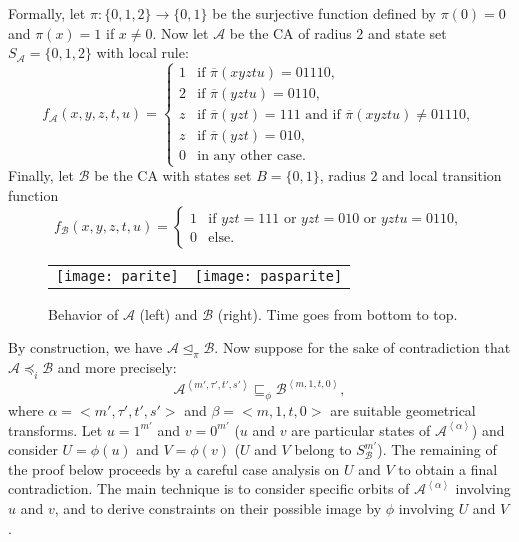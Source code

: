 \documentclass[a4paper]{elsarticle}
\newcommand{\ACA}{\mathcal{A}}
\newcommand{\ACB}{\mathcal{B}}
\newcommand{\locA}{f_{\ACA}}
\newcommand{\locB}{f_{\ACB}}
\newcommand\alphabe[1]{S_{#1}}
\newcommand{\alphA}{\alphabe{\ACA}}
\newcommand{\alphB}{\alphabe{\ACB}}
\newcommand\sac{\sqsubseteq}
\newcommand{\fac}{\trianglelefteq}
\newcommand\bulk[2]{{#1}^{\left\langle{#2}\right\rangle}}
\newcommand{\simu}{\preccurlyeq}
\newcommand{\sacsimu}{\simu_i}
\begin{document}
\begin{pf}
  Formally, let ${\pi : \{0,1,2\}\rightarrow \{0,1\}}$ be the
  surjective function defined by ${\pi(0)=0}$ and ${\pi(x)=1}$ if
  ${x\not=0}$. Now let $\ACA$ be the CA of radius $2$ and state set
  ${\alphA=\{0,1,2\}}$ with local rule:
  \[\locA(x,y,z,t,u)=
  \begin{cases}
    1&\text{if }\overline\pi(xyztu)=01110,\\
    2&\text{if }\overline\pi(yztu)=0110,\\
    z&\text{if }\overline\pi(yzt)=111\text{ and if }\overline\pi(xyztu)\not=01110,\\
    z&\text{if }\overline\pi(yzt)=010,\\
    0&\text{in any other case.}
  \end{cases}\] Finally, let $\ACB$ be the CA with states set
  ${B=\{0,1\}}$, radius $2$ and local transition function
  \[\locB(x,y,z,t,u)=
  \begin{cases}
    1&\text{if }yzt=111\text{ or }yzt=010\text{ or }yztu=0110,\\
    0&\text{else.}
  \end{cases}\] 
  \begin{figure}[htbp]
    \centering
    \begin{tabular}{cc}
      \texttt{[image: parite]} & \texttt{[image: pasparite]}
    \end{tabular}
    \caption{\label{fig:diagab}Behavior of $\ACA$ (left) and $\ACB$
      (right). Time goes from bottom to top.}
  \end{figure}
  By construction, we have ${\ACA\fac_\pi\ACB}$. Now suppose for the
  sake of contradiction that ${\ACA\sacsimu\ACB}$ and more precisely:
  \[\bulk{\ACA}{m',\tau',t',s'}\sac_\phi\bulk{\ACB}{m,1,t,0},\]
  where ${\alpha =<m',\tau',t',s'>}$ and ${\beta=<m,1,t,0>}$ are
  suitable geometrical transforms.  Let ${u=1^{m'}}$ and ${v=0^{m'}}$
  ($u$ and $v$ are particular states of $\bulk{\ACA}{\alpha}$) and
  consider ${U=\phi(u)}$ and ${V=\phi(v)}$ ($U$ and $V$ belong to
  ${\alphB^{m'}}$). The remaining of the proof below proceeds by a
  careful case analysis on $U$ and $V$ to obtain a final
  contradiction. The main technique is to consider specific orbits of
  $\bulk{\ACA}{\alpha}$ involving $u$ and $v$, and to derive
  constraints on their possible image by $\phi$ involving $U$ and $V$.


\end{pf}
\end{document}
